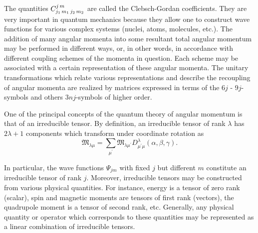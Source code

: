The quantities $C_{j_{1}\,m_{1}\,j_{2}\,m_{2}}^{j\,m}$ are called the Clebsch-Gordan coefficients. They are very important in quantum mechanics because they allow one to construct wave functions for various complex systems (nuclei, atoms, molecules, etc.). The addition of many angular momenta into some resultant total angular momentum may be performed in different ways, or, in other words, in accordance with different coupling schemes of the momenta in question. Each scheme may be associated with a certain representation of these angular momenta. The unitary transformations which relate various representations and describe the recoupling of angular momenta are realized by matrices expressed in terms of the $6 j$ - $9 j$-symbols and others $3 n j$-symbols of higher order.

One of the principal concepts of the quantum theory of angular momentum is that of an irreducible tensor. By definition, an irreducible tensor of rank $\lambda$ has $2 \lambda+1$ components which transform under coordinate rotation as
\begin{equation}
\mathfrak{M}_{\lambda \mu}=\sum_{\mu^{\prime}} \mathfrak{M}_{\lambda \mu^{\prime}} D_{\mu^{\prime} \mu}^{\lambda}(\alpha, \beta, \gamma).
\end{equation}

In particular, the wave functions $\Psi_{j m}$ with fixed $j$ but different $m$ constitute an irreducible tensor of rank $j$. Moreover, irreducible tensors may be constructed from various physical quantities. For instance, energy is a tensor of zero rank (scalar), spin and magnetic moments are tensors of first rank (vectors), the quadrupole moment is a tensor of second rank, etc. Generally, any physical quantity or operator which corresponds to these quantities may be represented as a linear combination of irreducible tensors.

